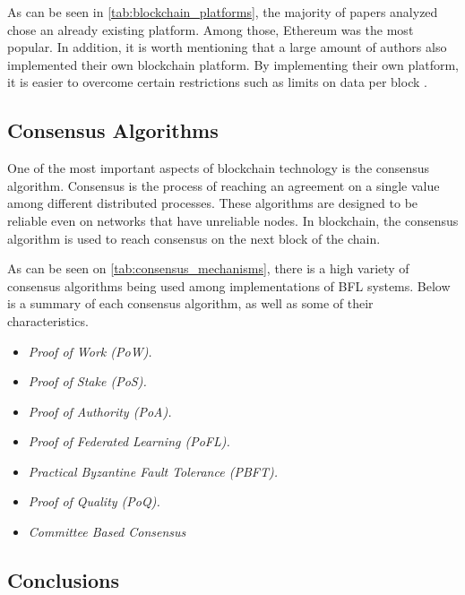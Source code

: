 As can be seen in \autoref{tab:blockchain_platforms}, the majority of papers analyzed chose an already existing platform. Among those, Ethereum was the most popular. In addition, it is worth mentioning that a large amount of authors also implemented their own blockchain platform. By implementing their own platform, it is easier to overcome certain restrictions such as limits on data per block \cite{8733825, 9524833}.



\subsection{Consensus Algorithms}

One of the most important aspects of blockchain technology is the consensus algorithm. Consensus is the process of reaching an agreement on a single value among different distributed processes. These algorithms are designed to be reliable even on networks that have unreliable nodes. In blockchain, the consensus algorithm is used to reach consensus on the next block of the chain.



As can be seen on \autoref{tab:consensus_mechanisms}, there is a high variety of consensus algorithms being used among implementations of BFL systems. Below is a summary of each consensus algorithm, as well as some of their characteristics.

\begin{itemize}
    \item \textit{Proof of Work (PoW).}
    
    \item \textit{Proof of Stake (PoS).}
    
    \item \textit{Proof of Authority (PoA).}
    
    \item \textit{Proof of Federated Learning (PoFL).}

    \item \textit{Practical Byzantine Fault Tolerance (PBFT).}
    
    \item \textit{Proof of Quality (PoQ).}

    \item \textit{Committee Based Consensus} 
\end{itemize}

\subsection{Conclusions}


